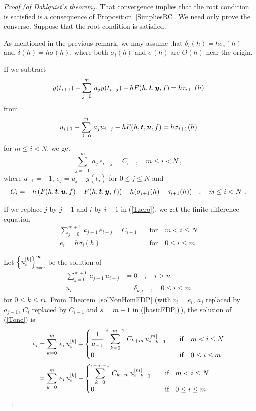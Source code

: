 \begin{proof}[Proof (of Dahlquist's theorem)]
That convergence implies that the root condition is satisfied is a
consequence of Proposition~\ref{SimpliesRC}.  We need only prove the
converse.  Suppose that the root condition is satisfied.

As mentioned in the previous remark, we may assume that
$\delta_i(h) = h \sigma_i(h)$ and $\delta(h) = h \sigma(h)$, where
both $\sigma_i(h)$ and $\sigma(h)$ are $O(h)$ near the origin.

If we subtract
\[
y(t_{i+1}) - \sum_{j=0}^m\,a_jy(t_{i-j})
- h F(h,\bm{t},\bm{y},f) = h \tau_{i+1}(h)
\]
from
\[
u_{i+1} - \sum_{j=0}^m\,a_j u_{i-j} - h F(h,\bm{t},\bm{u},f)
= h \sigma_{i+1}(h)
\]
for $m \leq i < N$, we get
\begin{equation} \label{Tzero}
\sum_{j=-1}^m\,a_j\,e_{i-j} = C_i \quad , \quad  m \leq i < N \ ,
\end{equation}
where $a_{-1} = -1$, $e_j = u_j - y(t_j)$ for $0 \leq j \leq N$ and
\[
C_i = -h \left( F(h,\bm{t},\bm{u},f) -
F(h,\bm{t},\bm{y},f) \right) - h ( \sigma_{i+1}(h) - \tau_{i+1}(h) )
\quad , \quad m \leq i < N \ .
\]

If we replace $j$ by $j-1$ and $i$ by $i-1$ in (\ref{Tzero}), we get
the finite difference equation
\begin{equation} \label{Tone}
\begin{split}
\sum_{j=0}^{m+1}\,a_{j-1}\,e_{i-j} = C_{i-1} &\quad \text{for} \quad
m < i \leq N \\
e_i = h\sigma_i(h) & \quad \text{for} \quad 0 \leq i \leq m
\end{split}
\end{equation}

Let $\displaystyle \left\{ u_i^{[k]} \right\}_{i=0}^\infty$ be the solution of
\begin{align*}
\sum_{j=0}^{m+1}\,a_{j-1}\,u_{i-j} &= 0 \quad , \quad i > m \\
u_i &= \delta_{k,i} \quad , \quad 0 \leq i \leq m
\end{align*}
for $0 \leq k \leq m$.
From Theorem~\ref{solNonHomFDP} (with $v_i= e_i$, $a_j$ replaced by
$a_{j-1}$, $C_i$ replaced by $C_{i-1}$ and $s=m+1$ in
(\ref{basicFDP})\,), the solution of (\ref{Tone}) is
\begin{align}
e_i &= \sum_{k=0}^m\,e_i\,u_i^{[k]}
+ \begin{cases}
\displaystyle \frac{1}{a_{-1}}\,
\sum_{k=0}^{i-m-1}\,C_{k+m}\,u_{i-k-1}^{[m]} & \quad \text{if} \quad
m<i \leq N \\
0  & \quad \text{if} \quad 0\leq i \leq m 
\end{cases} \nonumber  \\
&= \sum_{k=0}^m\,e_i\,u_i^{[k]}
- \begin{cases}
\displaystyle
\sum_{k=0}^{i-m-1}\,C_{k+m}\,u_{i-k-1}^{[m]} & \quad \text{if} \quad
m<i \leq N \\
0  & \quad \text{if} \quad 0\leq i \leq m 
\end{cases} \label{Ttwo}
\end{align}


\end{proof}
